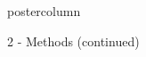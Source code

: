 \documentclass{beamer}
\begin{document}
\begin{frame}
\begin{columns}
\begin{column}{.499\textwidth}
\begin{beamercolorbox}[center]{postercolumn}
\begin{minipage}{.98\textwidth}
{\begin{myblock}{2 - Methods (continued)}
\begin{minipage}{0.39\textwidth}
								\end{minipage}
								
\end{myblock}
								
}
\end{minipage}
\end{beamercolorbox}
\end{column}
\end{columns}
\end{frame}
\end{document}
